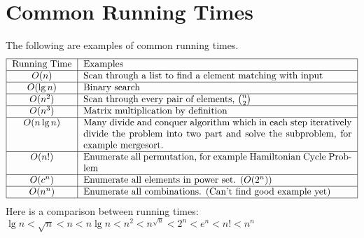 		\section{Common Running Times}
			The following are examples of common running times.
			\begin{align*}
				\centering
				\begin{tabular}{|c|p{10cm}|}
					\hline
					Running Time & Examples\\
					\hline
					$O(n)$ & Scan through a list to find a element matching with input\\
					\hline
					$O(\lg n)$ & Binary search\\
					\hline
					$O(n^2)$ & Scan through every pair of elements, $\binom{n}{2}$\\
					\hline
					$O(n^3)$ & Matrix multiplication by definition\\
					\hline
					$O(n\lg n)$ & Many divide and conquer algorithm which in each step iteratively divide the problem into two part and solve the subproblem, for example mergesort.\\
					\hline
					$O(n!)$ & Enumerate all permutation, for example Hamiltonian Cycle Problem\\
					\hline
					$O(c^n)$ & Enumerate all elements in power set. ($O(2^n)$)\\
					\hline
					$O(n^n)$ & Enumerate all combinations. (Can't find good example yet)\\
					\hline
				\end{tabular}
			\end{align*}
			Here is a comparison between running times: $\lg n < \sqrt{n} < n < n\lg n < n^2 < n^{\sqrt{n}} < 2^n < e^n < n! < n^n$

